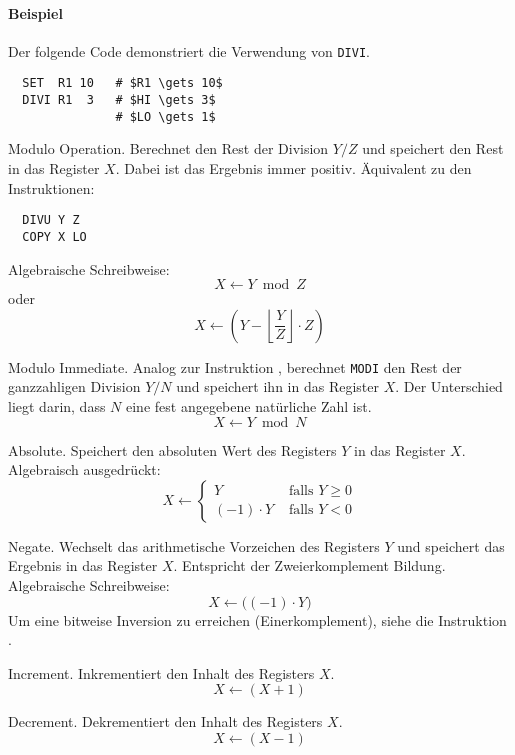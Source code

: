 \paragraph{Beispiel}
Der folgende Code demonstriert die Verwendung von \texttt{DIVI}.
\begin{lstlisting}
  SET  R1 10   # $R1 \gets 10$
  DIVI R1  3   # $HI \gets 3$
               # $LO \gets 1$
\end{lstlisting}





Modulo Operation.
Berechnet den Rest der Division $Y/Z$ und speichert den Rest in das Register
$X$. Dabei ist das Ergebnis immer positiv.
Äquivalent zu den Instruktionen:
\begin{lstlisting}
  DIVU Y Z
  COPY X LO
\end{lstlisting}

Algebraische Schreibweise:
\[
    X \gets Y \bmod Z
\]
oder
\[
    X \gets \left(
      Y - \left\lfloor \frac{Y}{Z}  \right\rfloor \cdot Z
      \right)
\]


\glqq Modulo Immediate\grqq. Analog zur Instruktion , berechnet
\texttt{MODI} den Rest der ganzzahligen Division $Y / N$ und speichert ihn in
das Register $X$. Der Unterschied liegt darin, dass $N$ eine fest angegebene
natürliche Zahl ist.
\[
    X \gets Y \bmod N
\]


\glqq Absolute\grqq.
Speichert den absoluten Wert des Registers $Y$ in das Register $X$.
Algebraisch ausgedrückt:
\[
    X \gets
    \begin{cases}
      Y            & \text{ falls } Y \geq 0 \\
      (-1) \cdot Y & \text{ falls } Y < 0
    \end{cases}
\]



\glqq Negate\grqq.
Wechselt das arithmetische Vorzeichen des Registers $Y$ und speichert das
Ergebnis in das Register $X$. Entspricht der Zweierkomplement Bildung.
Algebraische Schreibweise:
\[
    X \gets \big( (-1) \cdot Y \big)
\]
Um eine bitweise Inversion zu erreichen (Einerkomplement), siehe die
Instruktion .



\glqq Increment\grqq.
Inkrementiert den Inhalt des Registers $X$.
\[
    X \gets ( X + 1 )
\]



\glqq Decrement\grqq.
Dekrementiert den Inhalt des Registers $X$.
\[
    X \gets ( X - 1 )
\]



